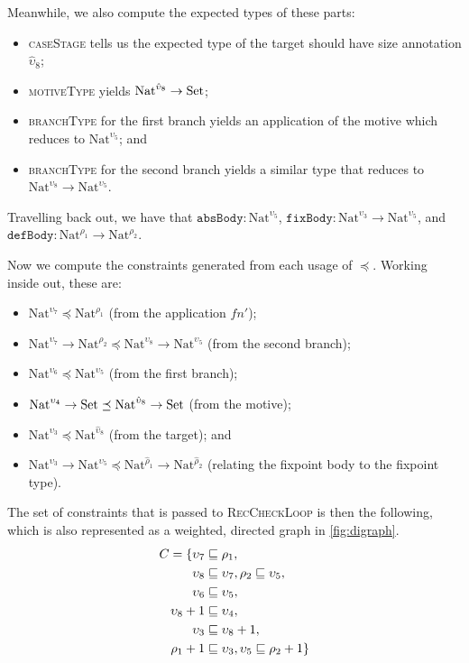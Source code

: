 \documentclass[nonacm,screen,10pt]{acmart}
\begin{document}
Meanwhile, we also compute the expected types of these parts:
\begin{itemize}
    \item \textsc{caseStage} tells us the expected type of the target should have size annotation $\hat{\upsilon}_8$;
    \item \textsc{motiveType} yields $\text{Nat}^{\hat{\upsilon}_8} \to \text{Set}$;
    \item \textsc{branchType} for the first branch yields an application of the motive which reduces to $\text{Nat}^{\upsilon_5}$; and
    \item \textsc{branchType} for the second branch yields a similar type that reduces to $\text{Nat}^{\upsilon_8} \to \text{Nat}^{\upsilon_5}$.
\end{itemize}

Travelling back out, we have that $\texttt{absBody}: \text{Nat}^{\upsilon_5}$, $\texttt{fixBody}: \text{Nat}^{\upsilon_3} \to \text{Nat}^{\upsilon_5}$, and $\texttt{defBody}: \text{Nat}^{\rho_1} \to \text{Nat}^{\rho_2}$.

Now we compute the constraints generated from each usage of $\preceq$. Working inside out, these are:
\begin{itemize}
    \item $\text{Nat}^{\upsilon_7} \preceq \text{Nat}^{\rho_1}$ (from the application $f n'$);
    \item $\text{Nat}^{\upsilon_7} \to \text{Nat}^{\rho_2} \preceq \text{Nat}^{\upsilon_8} \to \text{Nat}^{\upsilon_5}$ (from the second branch);
    \item $\text{Nat}^{\upsilon_6} \preceq \text{Nat}^{\upsilon_5}$ (from the first branch);
    \item $\text{Nat}^{\upsilon_4} \to \text{Set} \preceq \text{Nat}^{\hat{\upsilon}_8} \to \text{Set}$ (from the motive);
    \item $\text{Nat}^{\upsilon_3} \preceq \text{Nat}^{\hat{\upsilon}_8}$ (from the target); and
    \item $\text{Nat}^{\upsilon_3} \to \text{Nat}^{\upsilon_5} \preceq \text{Nat}^{\hat{\rho}_1} \to \text{Nat}^{\hat{\rho}_2}$ (relating the fixpoint body to the fixpoint type).
\end{itemize}

The set of constraints that is passed to \textsc{RecCheckLoop} is then the following, which is also represented as a weighted, directed graph in \autoref{fig:digraph}.
\begin{align*}
    C = \{\upsilon_7 &\sqsubseteq \rho_1, \\
    \upsilon_8 &\sqsubseteq \upsilon_7, \rho_2 \sqsubseteq \upsilon_5, \\
    \upsilon_6 &\sqsubseteq \upsilon_5, \\
    \upsilon_8+1 &\sqsubseteq \upsilon_4, \\
    \upsilon_3 &\sqsubseteq \upsilon_8+1, \\
    \rho_1+1 &\sqsubseteq \upsilon_3, \upsilon_5 \sqsubseteq \rho_2+1\}
\end{align*}
\end{document}

